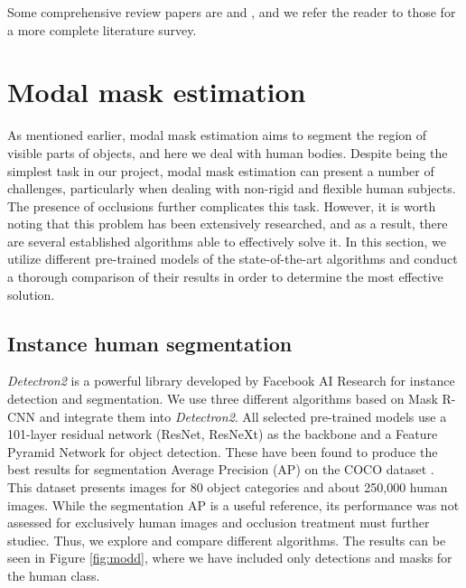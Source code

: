 \documentclass[]{interact}
\theoremstyle{plain}%
\theoremstyle{definition}
\theoremstyle{remark}
\begin{document}
Some comprehensive review papers are \citep{MUHAMMAD2022103628} and \citep{sarafianos20163d}, and we refer the reader to those for a more complete literature survey. 

\section{Modal mask estimation}
\label{section:modal}

As mentioned earlier, modal mask estimation aims to segment the region of visible parts of objects, and here we deal with human bodies. Despite being the simplest task in our project, modal mask estimation can present a number of challenges, particularly when dealing with non-rigid and flexible human subjects. The presence of occlusions further complicates this task. However, it is worth noting that this problem has been extensively researched, and as a result, there are several established algorithms able to effectively solve it. In this section, we utilize different pre-trained models of the state-of-the-art algorithms and conduct a thorough comparison of their results in order to determine the most effective solution.

\subsection{Instance human segmentation}

\textit{Detectron2} \citep{wu2019detectron2} is a powerful library developed by Facebook AI Research for instance detection and segmentation. We use three different algorithms based on Mask R-CNN \citep{MaskRCNN} and integrate them into \textit{Detectron2}. All selected pre-trained models use a 101-layer residual network (ResNet, ResNeXt) as the backbone and a Feature Pyramid Network for object detection. These have been found to produce the best results for segmentation Average Precision (AP) on the COCO dataset \citep{cocodataset}. This dataset presents images for 80 object categories and about 250,000 human images. While the segmentation AP is a useful reference, its performance was not assessed for exclusively human images and occlusion treatment must further studiec. Thus, we explore and compare different algorithms. The results can be seen in Figure \ref{fig:modd}, where we have included only detections and masks for the human class.
\end{document}
